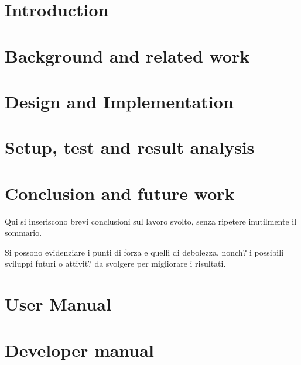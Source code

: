 \documentclass[pdfa%
,twoside%
,12pt%
]{toptesi}
\begin{document}
\indici

\mainmatter

\chapter{Introduction}
\chapter{Background and related work}



\chapter{Design and Implementation}



\chapter{Setup, test and result analysis}



\chapter{Conclusion and future work}

Qui si inseriscono brevi conclusioni sul lavoro svolto, senza ripetere inutilmente il sommario.

Si possono evidenziare i punti di forza e quelli di debolezza, nonch? i possibili sviluppi futuri o attivit? da svolgere per migliorare i risultati.

%




\appendix
\chapter{User Manual}

\chapter{Developer manual}

  
\end{document}
